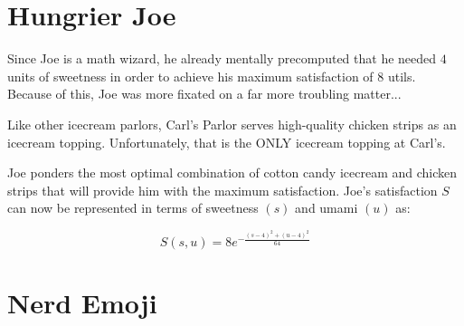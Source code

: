 
\setcounter{chapter}{2}
\chapter{Hungrier Joe}
Since Joe is a math wizard, he already mentally precomputed that he needed $4$ units of sweetness in order to achieve his maximum satisfaction of $8$ utils.
Because of this, Joe was more fixated on a far more troubling matter...

Like other icecream parlors, Carl's Parlor serves high-quality chicken strips as an icecream topping.
Unfortunately, that is the ONLY icecream topping at Carl's.

Joe ponders the most optimal combination of cotton candy icecream and chicken strips that will provide him with the maximum satisfaction.
Joe's satisfaction $S$ can now be represented in terms of sweetness $(s)$ and umami $(u)$ as:\par
\Large
\begin{equation}
	S(s, u) = 8e^{-\frac{(s-4)^2+(u-4)^2}{64}}
\end{equation}
\normalsize


\setcounter{chapter}{3}
\chapter{Nerd Emoji} %
